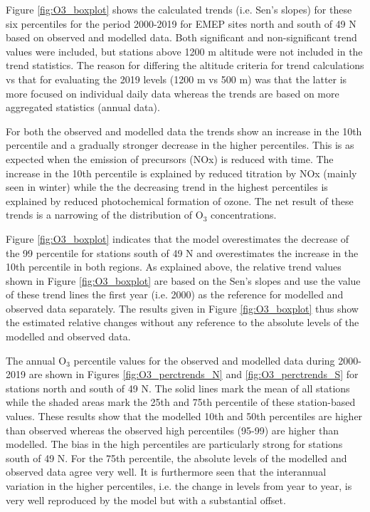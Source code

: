 Figure \ref{fig:O3_boxplot} shows the calculated trends (i.e. Sen's slopes) for these six percentiles for the period 2000-2019 for EMEP sites north and south of 49 \degrees N based on observed and modelled data. Both significant and non-significant trend values were included, but stations above 1200 m altitude were not included in the trend statistics. The reason for differing the altitude criteria for trend calculations vs that for evaluating the 2019 levels (1200 m vs 500 m) was that the latter is more focused on individual daily data whereas the trends are based on more aggregated statistics (annual data). 

For both the observed and modelled data the trends show an increase in the 10th percentile and a gradually stronger decrease in the higher percentiles. This is as expected when the emission of precursors (NOx) is reduced with time. The increase in the 10th percentile is explained by reduced titration by NOx (mainly seen in winter) while the the decreasing trend in the highest percentiles is explained by reduced photochemical formation of ozone. The net result of these trends is a narrowing of the distribution of O$_3$ concentrations. 

Figure \ref{fig:O3_boxplot} indicates that the model overestimates the decrease of the 99 percentile for stations south of 49 \degrees N and overestimates the increase in the 10th percentile in both regions. As explained above, the relative trend values shown in Figure \ref{fig:O3_boxplot} are based on the Sen's slopes and use the value of these trend lines the first year (i.e. 2000) as the reference for modelled and observed data separately. The results given in Figure \ref{fig:O3_boxplot} thus show the estimated relative changes without any reference to the absolute levels of the modelled and observed data. 

The annual O$_3$ percentile values for the observed and modelled data during 2000-2019 are shown in Figures \ref{fig:O3_perctrends_N} and \ref{fig:O3_perctrends_S} for stations north and south of 49 \degrees N. The solid lines mark the mean of all stations while the shaded areas mark the 25th and 75th percentile of these station-based values. These results show that the modelled 10th and 50th percentiles are higher than observed whereas the observed high percentiles (95-99) are higher than modelled. The bias in the high percentiles are particularly strong for stations south of 49 \degrees N. For the 75th percentile, the absolute levels of the modelled and observed data agree very well. It is furthermore seen that the interannual variation in the higher percentiles, i.e. the change in levels from year to year, is very well reproduced by the model but with a substantial offset. 

